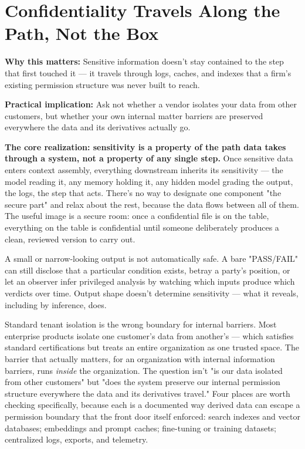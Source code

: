 \section{Confidentiality Travels Along the Path, Not the Box}

\textbf{Why this matters:} Sensitive information doesn't stay contained to the step that first touched it --- it travels through logs, caches, and indexes that a firm's existing permission structure was never built to reach.

\textbf{Practical implication:} Ask not whether a vendor isolates your data from other customers, but whether your own internal matter barriers are preserved everywhere the data and its derivatives actually go.

\textbf{The core realization: sensitivity is a property of the path data takes through a system, not a property of any single step.} Once sensitive data enters context assembly, everything downstream inherits its sensitivity --- the model reading it, any memory holding it, any hidden model grading the output, the logs, the step that acts. There's no way to designate one component "the secure part" and relax about the rest, because the data flows between all of them. The useful image is a secure room: once a confidential file is on the table, everything on the table is confidential until someone deliberately produces a clean, reviewed version to carry out.

A small or narrow-looking output is not automatically safe. A bare "PASS/FAIL" can still disclose that a particular condition exists, betray a party's position, or let an observer infer privileged analysis by watching which inputs produce which verdicts over time. Output shape doesn't determine sensitivity --- what it reveals, including by inference, does.

Standard tenant isolation is the wrong boundary for internal barriers. Most enterprise products isolate one customer's data from another's --- which satisfies standard certifications but treats an entire organization as one trusted space. The barrier that actually matters, for an organization with internal information barriers, runs \emph{inside} the organization. The question isn't "is our data isolated from other customers" but "does the system preserve our internal permission structure everywhere the data and its derivatives travel." Four places are worth checking specifically, because each is a documented way derived data can escape a permission boundary that the front door itself enforced: search indexes and vector databases; embeddings and prompt caches; fine-tuning or training datasets; centralized logs, exports, and telemetry.

